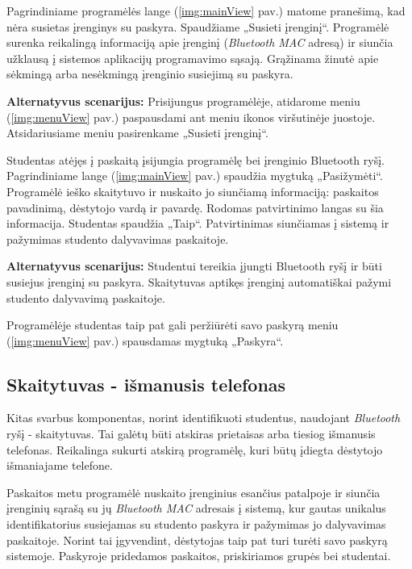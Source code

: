 \documentclass{VUMIFPSkursinis}
\begin{document}

Pagrindiniame programėlės lange (\ref{img:mainView} pav.) matome pranešimą, kad nėra susietas įrenginys su paskyra. Spaudžiame „Susieti įrenginį“. Programėlė surenka reikalingą informaciją apie įrenginį (\textit{Bluetooth MAC} adresą) ir siunčia užklausą į sistemos aplikacijų programavimo sąsają. Grąžinama žinutė apie sėkmingą arba nesėkmingą įrenginio susiejimą su paskyra.

\textbf{Alternatyvus scenarijus:} Prisijungus programėlėje, atidarome meniu (\ref{img:menuView} pav.) paspausdami ant meniu ikonos viršutinėje juostoje. Atsidariusiame meniu pasirenkame „Susieti įrenginį“.


Studentas atėjęs į paskaitą įsijungia programėlę bei įrenginio Bluetooth ryšį. Pagrindiniame lange (\ref{img:mainView} pav.) spaudžia mygtuką „Pasižymėti“. Programėlė ieško skaitytuvo ir nuskaito jo siunčiamą informaciją: paskaitos pavadinimą, dėstytojo vardą ir pavardę. Rodomas patvirtinimo langas su šia informacija. Studentas spaudžia „Taip“. Patvirtinimas siunčiamas į sistemą ir pažymimas studento dalyvavimas paskaitoje.

\textbf{Alternatyvus scenarijus:} Studentui tereikia įjungti Bluetooth ryšį ir būti susiejus įrenginį su paskyra. Skaitytuvas aptikęs įrenginį automatiškai pažymi studento dalyvavimą paskaitoje.


Programėlėje studentas taip pat gali peržiūrėti savo paskyrą meniu (\ref{img:menuView} pav.) spausdamas mygtuką „Paskyra“.

\subsection{Skaitytuvas - išmanusis telefonas} \label{TeacherApp}
Kitas svarbus komponentas, norint identifikuoti studentus, naudojant \textit{Bluetooth} ryšį - skaitytuvas. Tai galėtų būti atskiras prietaisas arba tiesiog išmanusis telefonas. Reikalinga sukurti atskirą programėlę, kuri būtų įdiegta dėstytojo išmaniajame telefone.

Paskaitos metu programėlė nuskaito įrenginius esančius patalpoje ir siunčia įrenginių sąrašą su jų \textit{Bluetooth MAC} adresais į sistemą, kur gautas unikalus identifikatorius susiejamas su studento paskyra ir pažymimas jo dalyvavimas paskaitoje. Norint tai įgyvendint, dėstytojas taip pat turi turėti savo paskyrą sistemoje. Paskyroje pridedamos paskaitos, priskiriamos grupės bei studentai.
\end{document}
